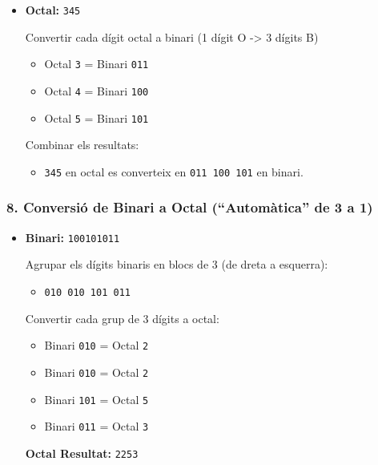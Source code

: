 \documentclass[
  12 pt,
  a4paper,
]{article}
\providecommand{\tightlist}{%
  \setlength{\itemsep}{0pt}\setlength{\parskip}{0pt}}
\begin{document}
\begin{itemize}
\item
  \textbf{Octal:} \texttt{345}

  Convertir cada dígit octal a binari (1 dígit O -\textgreater{} 3
  dígits B)

  \begin{itemize}
  \tightlist
  \item
    Octal \texttt{3} = Binari \texttt{011}
  \item
    Octal \texttt{4} = Binari \texttt{100}
  \item
    Octal \texttt{5} = Binari \texttt{101}
  \end{itemize}

  Combinar els resultats:

  \begin{itemize}
  \tightlist
  \item
    \texttt{345} en octal es converteix en \texttt{011\ 100\ 101} en
    binari.
  \end{itemize}
\end{itemize}

\subsubsection{8. Conversió de Binari a Octal (``Automàtica'' de 3 a
1)}\label{conversiuxf3-de-binari-a-octal-automuxe0tica-de-3-a-1}

\begin{itemize}
\item
  \textbf{Binari:} \texttt{100101011}

  Agrupar els dígits binaris en blocs de 3 (de dreta a esquerra):

  \begin{itemize}
  \tightlist
  \item
    \texttt{010\ 010\ 101\ 011}
  \end{itemize}

  Convertir cada grup de 3 dígits a octal:

  \begin{itemize}
  \tightlist
  \item
    Binari \texttt{010} = Octal \texttt{2}
  \item
    Binari \texttt{010} = Octal \texttt{2}
  \item
    Binari \texttt{101} = Octal \texttt{5}
  \item
    Binari \texttt{011} = Octal \texttt{3}
  \end{itemize}

  \textbf{Octal Resultat:} \texttt{2253}
\end{itemize}
\end{document}
